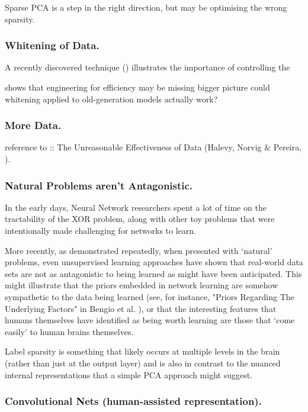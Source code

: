 \documentclass[citeauthoryear]{llncs}
\begin{document}
Sparse PCA is a step in the right direction, but may be optimising the wrong sparsity.
 


\subsubsection*{Whitening of Data.}

A recently discovered technique (\cite{WhiteningOfData}) illustrates 
the importance of controlling the 


    shows that engineering for efficiency may be missing bigger picture
    could whitening applied to old-generation models actually work?


\subsubsection*{More Data.}
  
reference to :: The Unreasonable Effectiveness of Data (Halevy, Norvig \& Pereira, \cite{norvig-UnreasonableEffectivenessOfData}).


\subsubsection*{Natural Problems aren't Antagonistic.}

In the early days, Neural Network researchers spent a lot of time on the 
tractability of the XOR problem, along with other toy problems that were 
intentionally made challenging for networks to learn.

More recently, as demonstrated repeatedly, when presented with `natural' problems, 
even unsupervised learning approaches have shown that real-world data sets 
are not as antagonistic to being learned as might have been anticipated.  
This might illustrate that the priors embedded in network learning are 
somehow sympathetic to the data being learned 
(see, for instance, "Priors Regarding The Underlying Factors" in Bengio et al. \cite{Bengio-et-al-2014-Book}),
or that the interesting features that humans themselves have identified as being 
worth learning are those that `come easily' to human brains themselves.

Label sparsity is something that likely occurs at multiple levels in the brain 
(rather than just at the output layer) and is also in contrast to the 
nuanced internal representations that a simple PCA approach might suggest.


\subsubsection*{Convolutional Nets (human-assisted representation).}
\end{document}
